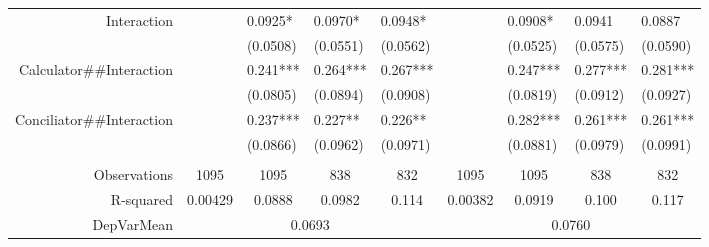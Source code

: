 \begin{tabular}{rrrrrrrrr}
Interaction & \multicolumn{1}{l}{} & \multicolumn{1}{l}{0.0925*} & \multicolumn{1}{l}{0.0970*} & \multicolumn{1}{l}{0.0948*} & \multicolumn{1}{l}{} & \multicolumn{1}{l}{0.0908*} & \multicolumn{1}{l}{0.0941} & \multicolumn{1}{l}{0.0887} \\
      & \multicolumn{1}{l}{} & \multicolumn{1}{l}{(0.0508)} & \multicolumn{1}{l}{(0.0551)} & \multicolumn{1}{l}{(0.0562)} & \multicolumn{1}{l}{} & \multicolumn{1}{l}{(0.0525)} & \multicolumn{1}{l}{(0.0575)} & \multicolumn{1}{l}{(0.0590)} \\
Calculator\#\#Interaction & \multicolumn{1}{l}{} & \multicolumn{1}{l}{0.241***} & \multicolumn{1}{l}{0.264***} & \multicolumn{1}{l}{0.267***} & \multicolumn{1}{l}{} & \multicolumn{1}{l}{0.247***} & \multicolumn{1}{l}{0.277***} & \multicolumn{1}{l}{0.281***} \\
      & \multicolumn{1}{l}{} & \multicolumn{1}{l}{(0.0805)} & \multicolumn{1}{l}{(0.0894)} & \multicolumn{1}{l}{(0.0908)} & \multicolumn{1}{l}{} & \multicolumn{1}{l}{(0.0819)} & \multicolumn{1}{l}{(0.0912)} & \multicolumn{1}{l}{(0.0927)} \\
Conciliator\#\#Interaction & \multicolumn{1}{l}{} & \multicolumn{1}{l}{0.237***} & \multicolumn{1}{l}{0.227**} & \multicolumn{1}{l}{0.226**} & \multicolumn{1}{l}{} & \multicolumn{1}{l}{0.282***} & \multicolumn{1}{l}{0.261***} & \multicolumn{1}{l}{0.261***} \\
      & \multicolumn{1}{l}{} & \multicolumn{1}{l}{(0.0866)} & \multicolumn{1}{l}{(0.0962)} & \multicolumn{1}{l}{(0.0971)} & \multicolumn{1}{l}{} & \multicolumn{1}{l}{(0.0881)} & \multicolumn{1}{l}{(0.0979)} & \multicolumn{1}{l}{(0.0991)} \\
      & \multicolumn{1}{l}{} & \multicolumn{1}{l}{} & \multicolumn{1}{l}{} & \multicolumn{1}{l}{} & \multicolumn{1}{l}{} & \multicolumn{1}{l}{} & \multicolumn{1}{l}{} & \multicolumn{1}{l}{} \\
      \midrule
Observations & \multicolumn{1}{c}{1095} & \multicolumn{1}{c}{1095} & \multicolumn{1}{c}{838} & \multicolumn{1}{c}{832} & \multicolumn{1}{c}{1095} & \multicolumn{1}{c}{1095} & \multicolumn{1}{c}{838} & \multicolumn{1}{c}{832} \\
R-squared & \multicolumn{1}{c}{0.00429} & \multicolumn{1}{c}{0.0888} & \multicolumn{1}{c}{0.0982} & \multicolumn{1}{c}{0.114} & \multicolumn{1}{c}{0.00382} & \multicolumn{1}{c}{0.0919} & \multicolumn{1}{c}{0.100} & \multicolumn{1}{c}{0.117} \\
DepVarMean & \multicolumn{4}{c}{0.0693}    & \multicolumn{4}{c}{0.0760} \\

\end{tabular}
